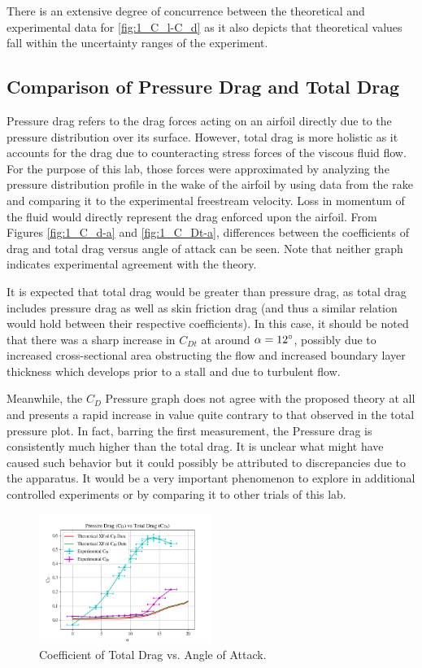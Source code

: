 \documentclass[11pt, letterpaper]{article}
\begin{document}
There is an extensive degree of concurrence between the theoretical and experimental data for \ref{fig:1_C_l-C_d} as it also depicts that theoretical values fall within the uncertainty ranges of the experiment. 
\subsection{Comparison of Pressure Drag and Total Drag}

Pressure drag refers to the drag forces acting on an airfoil directly due to the pressure distribution over its surface. However, total drag is more holistic as it accounts for the drag due to counteracting stress forces of the viscous fluid flow. For the purpose of this lab, those forces were approximated by analyzing the pressure distribution profile in the wake of the airfoil by using data from the rake and comparing it to the experimental freestream velocity. Loss in momentum of the fluid would directly represent the drag enforced upon the airfoil. From Figures \ref{fig:1_C_d-a} and \ref{fig:1_C_Dt-a}, differences between the coefficients of drag and total drag versus angle of attack can be seen. Note that neither graph indicates experimental agreement with the theory. 

It is expected that total drag would be greater than pressure drag, as total drag includes pressure drag as well as skin friction drag (and thus a similar relation would hold between their respective coefficients). In this case, it should be noted that there was a sharp increase in $C_{Dt}$ at around $\alpha = 12\degree$, possibly due to increased cross-sectional area obstructing the flow and increased boundary layer thickness which develops prior to a stall and due to turbulent flow. 

Meanwhile, the $C_D$ Pressure graph does not agree with the proposed theory at all and presents a rapid increase in value quite contrary to that observed in the total pressure plot. In fact, barring the first measurement, the Pressure drag is consistently much higher than the total drag. It is unclear what might have caused such behavior but it could possibly be attributed to discrepancies due to the apparatus. It would be a very important phenomenon to explore in additional controlled experiments or by comparing it to other trials of this lab.  

\begin{figure}[!ht]
        \centering        
        \includegraphics[width=0.5\textwidth]{Figures/C_d-C_dt.png}
        \caption{Coefficient of Total Drag vs. Angle of Attack.}
        \label{fig:1_C_Dt-Cd}
\end{figure}
\end{document}
